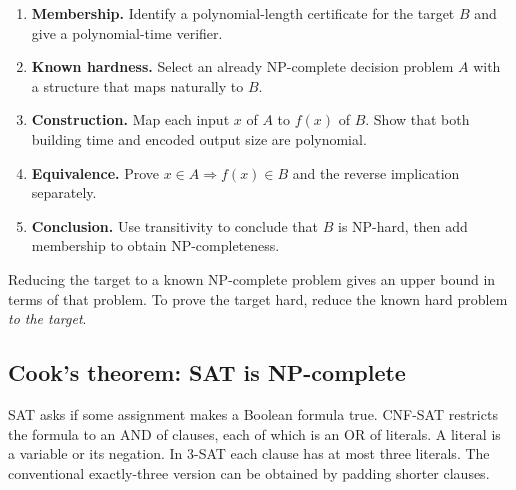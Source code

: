 \documentclass[12pt,a4paper]{article}
\begin{document}
\begin{enumerate}[leftmargin=*, itemsep=3pt, topsep=4pt]
  \item \textbf{Membership.} Identify a polynomial-length certificate for the target $B$ and give a polynomial-time verifier.
  \item \textbf{Known hardness.} Select an already NP-complete decision problem $A$ with a structure that maps naturally to $B$.
  \item \textbf{Construction.} Map each input $x$ of $A$ to $f(x)$ of $B$. Show that both building time and encoded output size are polynomial.
  \item \textbf{Equivalence.} Prove $x\in A\Rightarrow f(x)\in B$ and the reverse implication separately.
  \item \textbf{Conclusion.} Use transitivity to conclude that $B$ is NP-hard, then add membership to obtain NP-completeness.
\end{enumerate}
\begin{tcolorbox}[masonbox, title={Check the reduction direction}]
Reducing the target to a known NP-complete problem gives an upper bound in terms of that problem. To prove the target hard, reduce the known hard problem \emph{to the target}.
\end{tcolorbox}

\subsection{Cook's theorem: SAT is NP-complete}
\begin{tcolorbox}[defbox, title={SAT, CNF-SAT and 3-SAT}]
SAT asks if some assignment makes a Boolean formula true. CNF-SAT restricts the formula to an AND of clauses, each of which is an OR of literals. A literal is a variable or its negation. In 3-SAT each clause has at most three literals. The conventional exactly-three version can be obtained by padding shorter clauses.
\end{tcolorbox}
\end{document}
